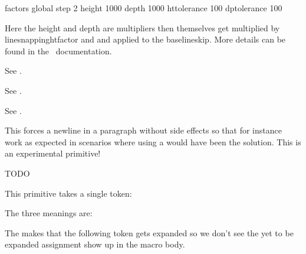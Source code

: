 \specificationdef \LineSnappingA {} factors global
    step           2
    height      1000
    depth       1000
    httolerance  100
    dptolerance  100
\relax
\stoptyping

Here the height and depth are multipliers then themselves get multiplied by \prm
{linesnappinghtfactor} and  and applied to the \prm
{baselineskip}. More details can be found in the \CONTEXT\ documentation.

\stopnewprimitive

\startnewprimitive[title={\prm {linesnappingdpfactor}}]

See .

\stopnewprimitive

\startnewprimitive[title={\prm {linesnappinghtfactor}}]

See .

\stopnewprimitive

\startnewprimitive[title={\prm {linesnappingtolerance}}]

See .

\stopnewprimitive

\startnewprimitive[title={\prm {localbreakpar}}]

This forces a newline in a paragraph without side effects so that for instance
 work as expected in scenarios where using a 
would have been the solution. This is an experimental primitive!

\stopnewprimitive

\startnewprimitive[title={\prm {localbrokenpenalty}}]
    TODO
\stopnewprimitive

\startnewprimitive[title={\prm {localcontrol}}]

This primitive takes a single token:

\startbuffer
\edef\testa{\scratchcounter123 \the\scratchcounter}
\edef\testc{\testa \the\scratchcounter}
\edef\testd{\localcontrol\testa \the\scratchcounter}
\stopbuffer

\typebuffer

The three meanings are:

\start \getbuffer
\starttabulate[|T|T|]
\NC \string\testa \NC \meaning\testa \NC \NR
\NC \string\testc \NC \meaning\testc \NC \NR
\NC \string\testd \NC \meaning\testd \NC \NR
\stoptabulate
\stop

The  makes that the following token gets expanded so we don't
see the yet to be expanded assignment show up in the macro body.

